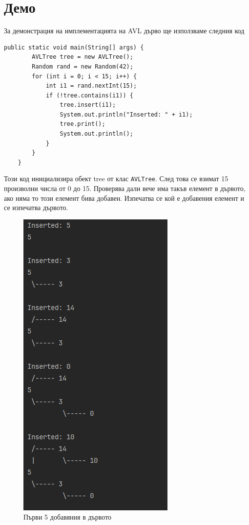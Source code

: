 \documentclass[a4paper,fleqn,12pt]{article}
\begin{document}
\section{Демо}
За демонстрация на имплементацията на AVL дърво ще използваме следния код
\begin{lstlisting}
public static void main(String[] args) {
        AVLTree tree = new AVLTree();
        Random rand = new Random(42);
        for (int i = 0; i < 15; i++) {
            int i1 = rand.nextInt(15);
            if (!tree.contains(i1)) {
                tree.insert(i1);
                System.out.println("Inserted: " + i1);
                tree.print();
                System.out.println();
            }
        }
    }
\end{lstlisting}
Този код инициализира обект tree от клас \texttt{AVLTree}. 
След това се взимат 15 произволни числа от 0 до 15. Проверява дали вече има такъв елемент в дървото, ако няма то този елемент бива добавен. 
Изпечатва се кой е добавения елемент и се изпечатва дървото.  
\begin{figure}[h!]
	\centering
        \includegraphics[scale=0.53]{images/result1.png}
        \caption{Първи 5 добавяния в дървото}
\end{figure}
\end{document}
